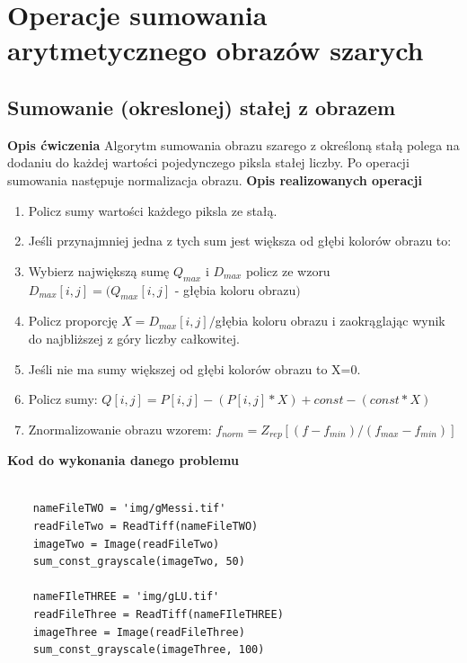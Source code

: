 \documentclass[magisterska,openany]{pracadypl}
\begin{document}
\chapter{Operacje sumowania arytmetycznego obrazów szarych}
\section{Sumowanie (okreslonej) stałej z obrazem}

\vspace{0.5cm}\textbf{\Large Opis ćwiczenia}
\vspace{0.25cm}\newline
Algorytm sumowania obrazu szarego z określoną stałą polega na dodaniu do każdej
wartości
pojedynczego piksla stałej liczby. Po operacji sumowania następuje normalizacja
obrazu.
\newline
\newline
\textbf{\Large Opis realizowanych operacji}
\begin{enumerate}
\item Policz sumy wartości każdego piksla ze stałą.
\item Jeśli przynajmniej jedna z tych sum jest większa od głębi kolorów obrazu to:
\item Wybierz największą sumę $Q_{max}$ i $D_{max}$ policz ze wzoru
\newline $D_{max}[i,j]=(Q_{max}[i,j]$ - głębia koloru obrazu$)$
\item Policz proporcję $X=D_{max}[i,j]/$głębia koloru obrazu 
\newline i zaokrąglając wynik do najbliższej z góry liczby całkowitej.
\item Jeśli nie ma sumy większej od głębi kolorów obrazu to X=0.
\item Policz sumy: 
\newline $Q[i,j]=P[i,j]-(P[i,j]*X)+const-(const*X)$
\item Znormalizowanie obrazu wzorem:
\newline $f_{norm}=Z_{rep}[(f-f_{min})/(f_{max}-f_{min})]$
\end{enumerate}

\newpage
\textbf{\Large Kod do wykonania danego problemu}
\lstset{language=Python}
\vspace{0.25cm}
\begin{lstlisting}

	nameFileTWO = 'img/gMessi.tif'
	readFileTwo = ReadTiff(nameFileTWO)
	imageTwo = Image(readFileTwo)
	sum_const_grayscale(imageTwo, 50)
    
	nameFIleTHREE = 'img/gLU.tif'
	readFileThree = ReadTiff(nameFIleTHREE)
	imageThree = Image(readFileThree)
	sum_const_grayscale(imageThree, 100)

\end{lstlisting}
\end{document}
